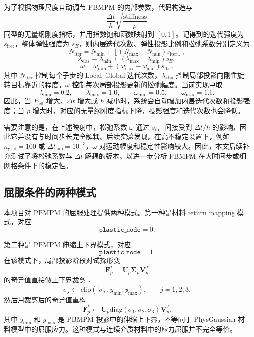 \documentclass[a4paper]{article}
\begin{document}
为了根据物理尺度自动调节 PBMPM 的内部参数，代码构造与
\[
    \frac{\Delta t}{h}
    \sqrt{
        \frac{\text{stiffness}}{\rho}
    }
\]
同型的无量纲刚度指标，并用指数饱和函数映射到 $[0,1]$。记得到的迭代强度为 $s_{\mathrm{iter}}$，整体弹性强度为 $s_E$，则内层迭代次数、弹性投影比例和松弛系数分别定义为
\[
    N_{\mathrm{iter}}
    =
    N_{\min}
    +
    \left\lfloor
        \left(
            N_{\max}-N_{\min}
        \right)
        s_{\mathrm{iter}}
    \right\rfloor,
\]
\[
    \lambda_{\mathrm{elas}}
    =
    \lambda_{\min}
    +
    \left(
        \lambda_{\max}
        -
        \lambda_{\min}
    \right)
    s_E,
\]
\[
    \omega
    =
    \omega_{\min}
    +
    \left(
        \omega_{\max}
        -
        \omega_{\min}
    \right)
    s_{\mathrm{iter}}.
\]
其中 $N_{\mathrm{iter}}$ 控制每个子步的 Local--Global 迭代次数，$\lambda_{\mathrm{elas}}$ 控制局部投影向刚性旋转目标靠近的程度，$\omega$ 控制每次局部投影更新的松弛幅度。当前实现中取
\[
    \lambda_{\min}=0.2,\qquad
    \lambda_{\max}=1.0,\qquad
    \omega_{\min}=0.5,\qquad
    \omega_{\max}=1.0.
\]
因此，当 $E_{\mathrm{eff}}$ 增大、$\Delta t$ 增大或 $h$ 减小时，系统会自动增加内层迭代次数和投影强度；当 $\rho$ 增大时，对应的无量纲刚度指标下降，投影强度和迭代次数也会降低。

需要注意的是，在上述映射中，松弛系数 $\omega$ 通过 $s_{\mathrm{iter}}$ 间接受到 $\Delta t/h$ 的影响，因此它并没有与时间步长完全解耦。后续实验发现，在高不稳定设置下，例如 $n_{\mathrm{grid}}=100$ 或 $\Delta t_{\mathrm{sub}}=10^{-3}$，$\omega$ 对运动幅度和稳定性影响较大。因此，本文后续补充测试了将松弛系数与 $\Delta t$ 解耦的版本，以进一步分析 PBMPM 在大时间步或细网格条件下的稳定性。
\subsection{屈服条件的两种模式}

本项目对 PBMPM 的屈服处理提供两种模式。第一种是材料 return mapping 模式，对应
\[
    \texttt{plastic\_mode}=0.
\]

第二种是 PBMPM 伸缩上下界模式，对应
\[
    \texttt{plastic\_mode}=1.
\]
在该模式下，局部投影阶段对试探形变
\[
    \bm{F}_p^\ast
    =
    \bm{U}_p
    \bm{\Sigma}_p
    \bm{V}_p^T
\]
的奇异值直接做上下界裁剪：
\[
    \sigma_j
    \leftarrow
    \mathrm{clip}
    \left(
        |\sigma_j|,
        y_{\min},
        y_{\max}
    \right),
    \qquad
    j=1,2,3.
\]
然后用裁剪后的奇异值重构
\[
    \bm{F}_p^\ast
    \leftarrow
    \bm{U}_p
    \mathrm{diag}
    \left(
        \sigma_1,
        \sigma_2,
        \sigma_3
    \right)
    \bm{V}_p^T.
\]
其中 $y_{\min}$ 和 $y_{\max}$ 是 PBMPM 投影中的伸缩上下界，不等同于 PhysGaussian 材料模型中的屈服应力。这种模式与连续介质材料中的应力屈服并不完全等价。
\end{document}

